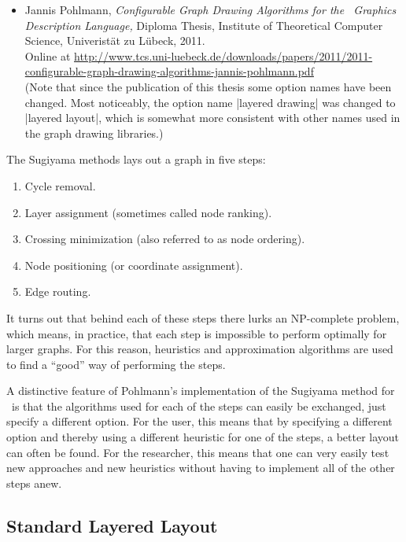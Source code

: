 \begin{itemize}
\item
  Jannis Pohlmann,
  \newblock \emph{Configurable Graph Drawing Algorithms
    for the \tikzname\ Graphics Description Language,}
  \newblock Diploma Thesis,
  \newblock Institute of Theoretical Computer Science, Univerist\"at
  zu L\"ubeck, 2011.\\[.5em]
  \newblock Online at 
  \url{http://www.tcs.uni-luebeck.de/downloads/papers/2011/2011-configurable-graph-drawing-algorithms-jannis-pohlmann.pdf}
  \\[.5em]
  (Note that since the publication of this thesis some option names
  have been changed. Most noticeably, the option name
  |layered drawing| was changed to |layered layout|, which is somewhat
  more consistent with other names used in the graph drawing
  libraries.) 
\end{itemize}

The Sugiyama methods lays out a graph in five steps:
\begin{enumerate}
\item Cycle removal.
\item Layer assignment (sometimes called node ranking).
\item Crossing minimization (also referred to as node ordering).
\item Node positioning (or coordinate assignment).
\item Edge routing.
\end{enumerate}
It turns out that behind each of these steps there lurks an
NP-complete problem, which means, in practice, that each step is
impossible to perform optimally for larger graphs. For this reason,
heuristics and approximation algorithms are used to find a ``good''
way of performing the steps.

A distinctive feature of Pohlmann's implementation of the Sugiyama
method for \tikzname\ is that the algorithms used for each of the
steps can easily be exchanged, just specify a different option. For
the user, this means that by specifying a different 
option and thereby using a different heuristic for one of the steps, a
better layout can often be found. For the researcher, this means that
one can very easily test new approaches and new heuristics without
having to implement all of the other steps anew. 



\subsection{Standard Layered Layout}

